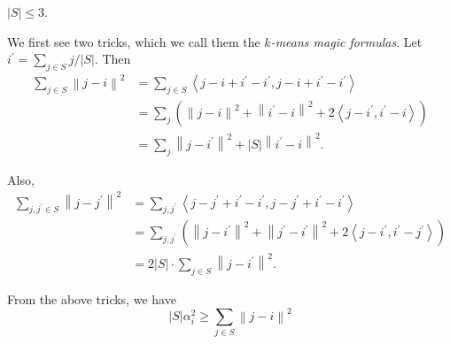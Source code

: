 \begin{claim}
	\(\left\vert S \right\vert \leq 3\).
\end{claim}
\begin{explanation}
	We first see two tricks, which we call them the \emph{\(k\)-means magic formulas}. Let \(i^\prime = \sum_{j\in S} j / \left\vert S \right\vert\). Then
	\[
		\begin{split}
			\sum_{j\in S} \left\lVert j - i\right\rVert ^{2}
			&= \sum_{j\in S} \left\langle j - i + i^\prime - i^\prime , j - i + i^\prime - i^\prime  \right\rangle \\
			&= \sum_{j} \left( \left\lVert j - i\right\rVert ^{2} + \left\lVert i^\prime - i\right\rVert ^{2} + 2\left\langle j - i^\prime , i^\prime - i \right\rangle  \right) \\
			&= \sum_{j} \left\lVert j - i^\prime \right\rVert ^{2} + \left\vert S \right\vert \left\lVert i^\prime - i\right\rVert ^{2} .
		\end{split}
	\]

	Also,
	\[
		\begin{split}
			\sum_{j, j^\prime \in S} \left\lVert j - j^\prime \right\rVert ^{2}
			&= \sum_{j, j^\prime }\left\langle j- j^\prime + i^\prime - i^\prime , j- j^\prime + i^\prime - i^\prime  \right\rangle  \\
			&= \sum_{j, j^\prime } \left( \left\lVert j - i^\prime \right\rVert^{2} + \left\lVert j^\prime - i^\prime \right\rVert ^{2} + 2 \left\langle j -i^\prime , i^\prime - j^\prime  \right\rangle   \right) \\
			&= 2\left\vert S \right\vert \cdot \sum_{j\in S} \left\lVert j - i^\prime \right\rVert ^{2} .
		\end{split}
	\]

	From the above tricks, we have
	\[
		\left\vert S \right\vert \alpha _i^{2} \geq \sum_{j\in S} \left\lVert j - i\right\rVert ^{2}
	\]
\end{explanation}
